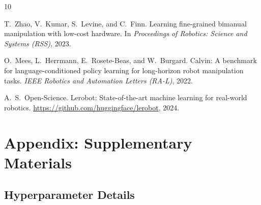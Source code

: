 \documentclass[twoside,twocolumn,10pt]{article}
\begin{document}

\begin{thebibliography}{10}

T.~Zhao, V.~Kumar, S.~Levine, and C.~Finn.
\newblock Learning fine-grained bimanual manipulation with low-cost hardware.
\newblock In \emph{Proceedings of Robotics: Science and Systems (RSS)}, 2023.

O.~Mees, L.~Herrmann, E.~Rosete-Beas, and W.~Burgard.
\newblock Calvin: A benchmark for language-conditioned policy learning for
long-horizon robot manipulation tasks.
\newblock \emph{IEEE Robotics and Automation Letters (RA-L)}, 2022.

A.~S.~Open-Science.
\newblock Lerobot: State-of-the-art machine learning for real-world robotics.
\newblock \url{https://github.com/huggingface/lerobot}, 2024.

\end{thebibliography}

\appendix
\section*{Appendix: Supplementary Materials}

\subsection*{Hyperparameter Details}
\end{document}
